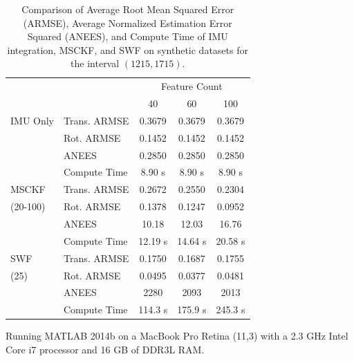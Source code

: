 \documentclass[letterpaper, 10 pt, conference]{ieeeconf}  %
\newcommand\T{\rule{0pt}{2.6ex}}        %
\newcommand\B{\rule[-1.2ex]{0pt}{0pt}} %
\begin{document}
\begin{table}
    \centering
    \caption{Comparison of Average Root Mean Squared Error (ARMSE), Average Normalized Estimation Error Squared (ANEES), and Compute Time of IMU integration, MSCKF, and SWF on synthetic datasets for the interval $(1215,1715)$.}
    \begin{threeparttable}
    \begin{tabular}{llccc} 
                    &                   & \multicolumn{3}{c}{Feature Count} \B      \\ \cline{3-5}
                    &                   & 40        & 60        & 100       \T\B    \\ \hline
        IMU Only    & Trans. ARMSE    & 0.3679    & 0.3679    & 0.3679    \T      \\
                    & Rot. ARMSE    & 0.1452    & 0.1452    & 0.1452            \\
                    & ANEES             & 0.2850    & 0.2850    & 0.2850            \\
                    & Compute Time\tnote{\dag}      & 8.90 s    & 8.90 s    & 8.90 s    \B      \\ \hline
        MSCKF       & Trans. ARMSE    & 0.2672    & 0.2550    & 0.2304    \T      \\
        (20-100)            & Rot. ARMSE    & 0.1378    & 0.1247    & 0.0952            \\
                    & ANEES             & 10.18     & 12.03     & 16.76             \\
                    & Compute Time\tnote{\dag}     & 12.19 s   & 14.64 s   & 20.58 s   \B      \\ \hline
        SWF         & Trans. ARMSE    & 0.1750    & 0.1687    & 0.1755    \T      \\
         (25)       & Rot. ARMSE    & 0.0495    & 0.0377    & 0.0481            \\
                    & ANEES             & 2280      & 2093      & 2013              \\
                    & Compute Time\tnote{\dag}     & 114.3 s   & 175.9 s   & 245.3 s   \B      \\ \hline
    \end{tabular}
    \begin{tablenotes}
        \item [\dag] Running MATLAB 2014b on a MacBook Pro Retina (11,3) with a 2.3 GHz Intel Core i7 processor and 16 GB of DDR3L RAM.
    \end{tablenotes}
    \end{threeparttable}
    \label{tab:rmse_nees}
    \vspace{-0.2cm}
\end{table}
\end{document}
